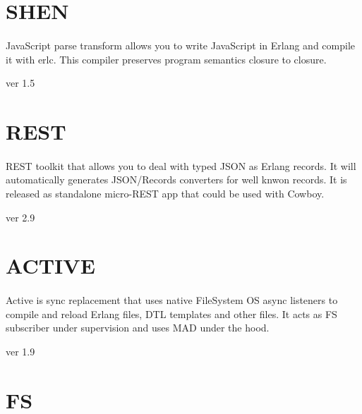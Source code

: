\documentclass[11pt]{article}
\begin{document}
\section*{SHEN}
\paragraph{}    
JavaScript parse transform allows you to write JavaScript in Erlang and
compile it with erlc. This compiler preserves program semantics closure to closure.

 ver 1.5

\section*{REST}
\paragraph{}
REST toolkit that allows you to deal with typed JSON as Erlang records.
It will automatically generates JSON/Records converters for well knwon records.
It is released as standalone micro-REST app that could be used with Cowboy.

 ver 2.9


\section*{ACTIVE}
\paragraph{}
Active is sync replacement that uses native FileSystem OS async
listeners to compile and reload Erlang files, DTL templates and other files.
It acts as FS subscriber under supervision and uses MAD under the hood.

 ver 1.9

\section*{FS}
\end{document}
